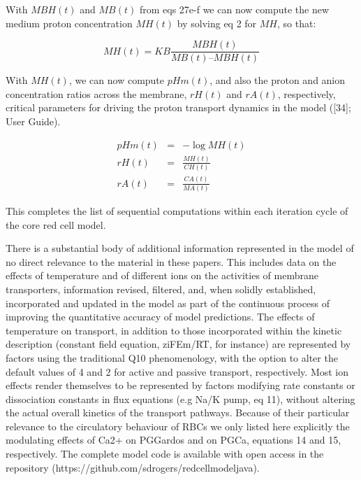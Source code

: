 \documentclass[a4paper]{article}
\newcommand{\med}[1]{M#1}
\newcommand{\cell}[1]{C#1}
\newcommand{\MA}{\med{A}}
\newcommand{\MB}{\med{B}}
\newcommand{\MBH}{\med{BH}}
\newcommand{\MH}{\med{H}}
\newcommand{\CH}{\cell{H}}
\newcommand{\CA}{\cell{A}}
\begin{document}
With $MBH(t)$ and $MB(t)$ from eqs 27e-f we can now compute the new medium proton concentration $MH(t)$ by solving eq 2 for $MH$, so that:

\setcounter{equation}{0}
\renewcommand{\theequation}{28\alph{equation}}

\begin{equation}
\MH(t) = KB\frac{\MBH(t)}{\MB(t) – \MBH(t)}
\end{equation}

With $MH(t)$, we can now compute $pHm(t)$, and also the proton and anion concentration ratios across the membrane, $rH(t)$ and $rA(t)$, respectively, critical parameters for driving the proton transport dynamics in the model ([34]; User Guide).

\begin{eqnarray}
pHm(t)&=& -\log\MH(t)\\
rH(t) &=&\frac{\MH(t)}{\CH(t)} \\
rA(t) &=& \frac{\CA(t)}{\MA(t)} 
\end{eqnarray}

This completes the list of sequential computations within each iteration cycle of the core red cell model.    

There is a substantial body of additional information represented in the model of no direct relevance to the material in these papers.  This includes data on the effects of temperature and of different ions on the activities of membrane transporters, information revised, filtered, and, when solidly established, incorporated and updated in the model as part of the continuous process of improving the quantitative accuracy of model predictions.  The effects of temperature on transport, in addition to those incorporated within the kinetic description (constant field equation, ziFEm/RT, for instance) are represented by factors using the traditional Q10 phenomenology, with the option to alter the default values of 4 and 2 for active and passive transport, respectively.  Most ion effects render themselves to be represented by factors modifying rate constants or dissociation constants in flux equations (e.g Na/K pump, eq 11), without altering the actual overall kinetics of the transport pathways. Because of their particular relevance to the circulatory behaviour of RBCs we only listed here explicitly the modulating effects of Ca2+ on PGGardos and on PGCa, equations 14 and 15, respectively. The complete model code is available with open access in the repository (https://github.com/sdrogers/redcellmodeljava).   
\end{document}
